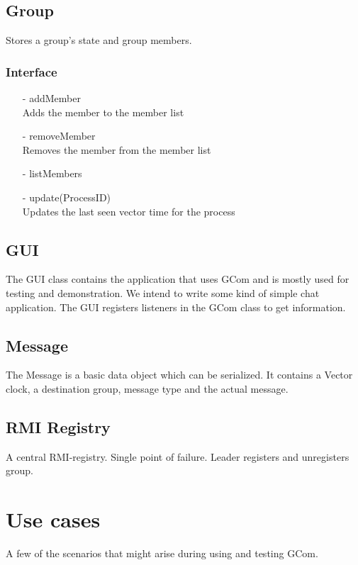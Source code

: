 \documentclass[english]{article}
\begin{document}
\subsection{Group}
Stores a group's state and group members.

\subsubsection{Interface}
\begin{itemize}
\item[-] addMember \\
	Adds the member to the member list
\item[-]  removeMember \\
	Removes the member from the member list
\item[-]  listMembers
\item[-]  update(ProcessID) \\
	Updates the last seen vector time for the process
\end{itemize}


\subsection{GUI}
The GUI class contains the application that uses GCom and is mostly used for testing and demonstration. We intend to write some kind of simple chat application. The GUI registers listeners in the GCom class to get information. 


\subsection{Message}
The Message is a basic data object which can be serialized. It contains a Vector clock, a destination group, message type and the actual message. 

\subsection{RMI Registry}
A central RMI-registry. Single point of failure. Leader registers and unregisters group. 

\section{Use cases}

A few of the scenarios that might arise during using and testing GCom.
\end{document}
